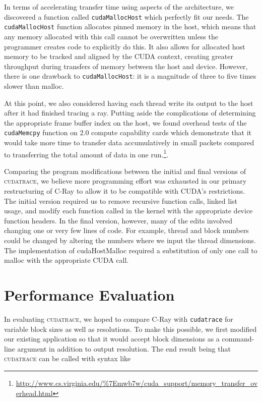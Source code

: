 \documentclass[12pt]{article}
\begin{document}
In terms of accelerating transfer time using aspects of the architecture, we discovered a function called \texttt{cudaMallocHost} which perfectly fit our needs. The \texttt{cudaMallocHost} function allocates pinned memory in the host, which means that any memory allocated with this call cannot be overwritten unless the programmer creates code to explicitly do this. It also allows for allocated host memory to be tracked and aligned by the CUDA context, creating greater throughput during transfers of memory between the host and device. However, there is one drawback to \texttt{cudaMallocHost}: it is a magnitude of three to five times slower than malloc. 

At this point, we also considered having each thread write its output to the host after it had finished tracing a ray. Putting aside the complications of determining the appropriate frame buffer index on the host, we found overhead tests of the \texttt{cudaMemcpy} function on 2.0 compute capability cards which demonstrate that it would take more time to transfer data accumulatively in small packets compared to transferring the total amount of data in one run.\footnote{\url{http://www.cs.virginia.edu/\%7Emwb7w/cuda\_support/memory\_transfer\_overhead.html}}.

Comparing the program modifications between the initial and final versions of \textsc{cudatrace}, we believe more programming effort was exhausted in our primary restructuring of C-Ray to allow it to be compatible with CUDA's restrictions. The initial version required us to remove recursive function calls, linked list usage, and modify each function called in the kernel with the appropriate device function headers. In the final version, however, many of the edits involved changing one or very few lines of code. For example, thread and block numbers could be changed by altering the numbers where we input the thread dimensions. The implementation of cudaHostMalloc required a substitution of only one call to malloc with the appropriate CUDA  call. 

\section{Performance Evaluation}

In evaluating \textsc{cudatrace}, we hoped to compare C-Ray with \texttt{cudatrace} for variable block sizes as well as resolutions. To make this possible, we first modified our existing application so that it would accept block dimensions as a command-line argument in addition to output resolution. The end result being that \textsc{cudatrace} can be called with syntax like
            
\end{document}
